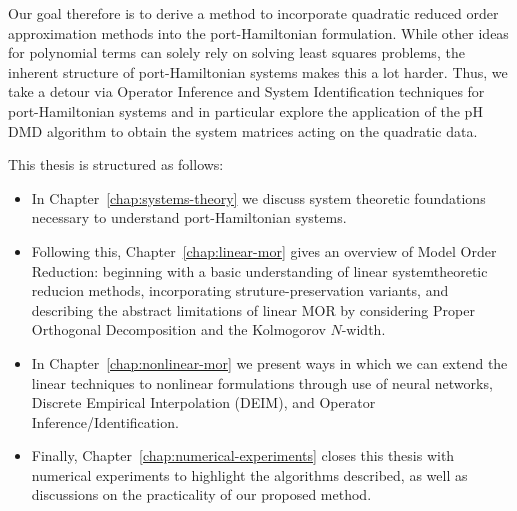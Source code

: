 
Our goal therefore is to derive a method to incorporate quadratic reduced order approximation methods into the port-Hamiltonian formulation.
While other ideas for polynomial terms can solely rely on solving least squares problems, the inherent structure of port-Hamiltonian systems makes this a lot harder.
Thus, we take a detour via Operator Inference and System Identification techniques for port-Hamiltonian systems and in particular explore the application of the pH DMD algorithm to obtain the system matrices acting on the quadratic data.

This thesis is structured as follows:
\begin{itemize}
    \item In Chapter~\ref{chap:systems-theory} we discuss system theoretic foundations necessary to understand port-Hamiltonian systems.
    \item Following this, Chapter~\ref{chap:linear-mor} gives an overview of Model Order Reduction: beginning with a basic understanding of linear systemtheoretic reducion methods, incorporating struture-preservation variants, and describing the abstract limitations of linear MOR by considering Proper Orthogonal Decomposition and the Kolmogorov $N$-width.
    \item In Chapter~\ref{chap:nonlinear-mor} we present ways in which we can extend the linear techniques to nonlinear formulations through use of neural networks, Discrete Empirical Interpolation (DEIM), and Operator Inference/Identification.
    \item Finally, Chapter~\ref{chap:numerical-experiments} closes this thesis with numerical experiments to highlight the algorithms described, as well as discussions on the practicality of our proposed method.
\end{itemize}
